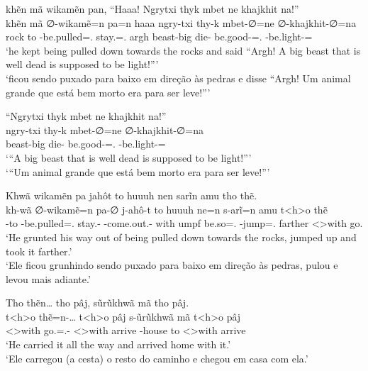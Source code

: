 \documentclass[output=paper,
modfonts,nonflat
]{langsci/langscibook}
\begin{document}
\ea  khẽn mã wikamẽn pan, ``Haaa! Ngrytxi thyk mbet ne khajkhit na!'' \\[.3em]
\gll khẽn mã ∅-wikamẽ=n                  pa=n                haaa ngry-txi  thy-k       mbet-∅=ne                  ∅-khajkhit-∅=na                  \\
     rock to \Third-be.pulled=\AAnd.\Ss{} stay.\Pl=\AAnd.\Ss{} argh beast-big die-\Nmlz{} be.good-\Nmlz{}=\AAnd.\Ss{} \Third-be.light-\Nmlz{}=\N\Fut{} \\
\glt `he kept being pulled down towards the rocks and said ``Argh! A big beast that is well dead is supposed to be light!''{}' \\
     `ficou sendo puxado para baixo em direção às pedras e disse ``Argh! Um animal grande que está bem morto era para ser leve!''{}' \\
\z

\ea  ``Ngrytxi thyk mbet ne khajkhit na!'' \\[.3em]
\gll ngry-txi  thy-k       mbet-∅=ne                  ∅-khajkhit-∅=na                  \\
     beast-big die-\Nmlz{} be.good-\Nmlz{}=\AAnd.\Ss{} \Third-be.light-\Nmlz{}=\N\Fut{} \\
\glt `{}``A big beast that is well dead is supposed to be light!''{}' \\
     `{}``Um animal grande que está bem morto era para ser leve!''{}' \\
\z

\ea  Khwã wikamẽn pa jahôt to huuuh nen sarĩn amu tho thẽ. \\[.3em]
\gll kh-wã     ∅-wikamẽ=n                  pa-∅             j-ahô-t                 to   huuuh ne=n             s-arĩ=n                amu     t<h>o        thẽ      \\
     \Third-to \Third-be.pulled=\AAnd.\Ss{} stay.\Pl-\Nmlz{} \E-come.out.\Pl-\Nmlz{} with umpf  be.so=\AAnd.\Ss{} \Third-jump=\AAnd.\Ss{} farther <\Third>with go.\Sg{} \\
\glt `He grunted his way out of being pulled down towards the rocks, jumped up and took it farther.' \\
     `Ele ficou grunhindo sendo puxado para baixo em direção às pedras, pulou e levou mais adiante.' \\
\z

\ea  Tho thẽn\ldots{} tho pâj, sũrũkhwã mã tho pâj. \\[.3em]
\gll t<h>o        thẽ=n-\ldots{}             t<h>o        pâj    s-ũrũkhwã    mã t<h>o        pâj    \\
     <\Third>with go.\Sg=\AAnd.\Ss{}-\Ints{} <\Third>with arrive \Third-house to <\Third>with arrive \\
\glt `He carried it all the way and arrived home with it.' \\
     `Ele carregou (a cesta) o resto do caminho e chegou em casa com ela.' \\
\z
\end{document}
